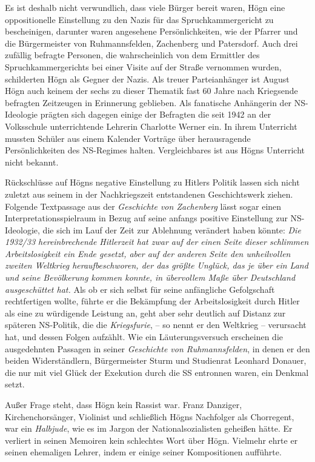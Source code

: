 \documentclass{book}
\begin{document}

Es ist deshalb nicht verwundlich, dass viele Bürger bereit waren, Högn
eine oppositionelle Einstellung zu den Nazis für das
Spruchkammergericht zu bescheinigen, darunter waren angesehene
Persönlichkeiten, wie der Pfarrer und die Bürgermeister von
Ruhmannsfelden, Zachenberg und Patersdorf. Auch drei zufällig befragte
Personen, die wahrscheinlich von dem Ermittler des Spruchkammergerichts
bei einer Visite auf der Straße vernommen wur\-den, schilderten Högn
als Gegner der Nazis. Als treuer Parteianhänger ist Au\-gust Högn auch
keinem der sechs zu dieser Thematik fast 60 Jahre nach Kriegsende
befragten Zeitzeugen in Erinnerung geblieben. Als fanatische
An\-hängerin der NS-Ideologie prägten sich dagegen einige der Befragten
die seit 1942 an der Volksschule unterrichtende Lehrerin Charlotte
Werner ein. In ihrem Unterricht mussten Schüler aus einem Kalender
Vorträge über heraus\-ragende Persönlichkeiten des NS-Regimes halten.
Vergleichbares ist aus Högns Unterricht nicht bekannt.

Rückschlüsse auf Högns negative Einstellung zu Hitlers Politik lassen
sich nicht zuletzt aus seinem in der Nachkriegszeit entstandenen
Geschichtswerk ziehen. Folgende Textpassage aus der \textit{Geschichte
von Zachenberg} lässt sogar einen Interpretationsspielraum in Bezug auf
seine anfangs positive Einstellung zur NS-Ideologie, die sich im Lauf
der Zeit zur Ablehnung verändert haben könn\-te: \textit{Die 1932/33
hereinbrechende Hitlerzeit hat zwar auf der einen Seite dieser
schlimmen Arbeitslosigkeit ein Ende gesetzt, aber auf der anderen Seite
den unheilvollen zweiten Weltkrieg heraufbeschworen, der das größte
Unglück, das je über ein Land und seine Bevölkerung kommen konnte, in
übervollem Maße über Deutschland ausgeschüttet hat.} Als ob er sich
selbst für seine anfängliche Gefolgschaft rechtfertigen wollte, führte
er die Bekämpfung der Arbeitslosigkeit durch Hitler als eine zu
würdigende Leistung an, geht aber sehr deutlich auf Distanz zur
späteren NS-Politik, die die \textit{Kriegsfurie}, – so nennt er den
Weltkrieg – verursacht hat, und dessen Folgen aufzählt. Wie ein
Läuterungsversuch erscheinen die ausgedehnten Passagen in seiner
\textit{Geschichte von Ruhmannsfelden}, in denen er den beiden
Widerständlern, Bürgermeister Sturm und Studienrat Leonhard Donauer,
die nur mit viel Glück der Exekution durch die SS entronnen waren, ein
Denkmal setzt.

Außer Frage steht, dass Högn kein Rassist war. Franz Danziger,
Kirchen\-chorsänger, Violinist und schließlich Högns Nachfolger als
Chorregent, war ein \textit{Halbjude}, wie es im Jargon der
Nationalsozialisten geheißen hätte. Er ver\-liert in seinen Memoiren
kein schlechtes Wort über Högn. Vielmehr ehrte er seinen ehemaligen
Lehrer, indem er einige seiner Kompositionen aufführte.
\end{document}
